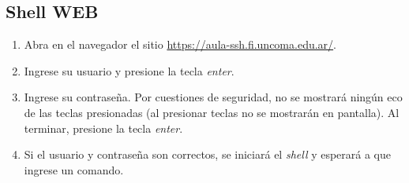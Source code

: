 \documentclass[12pt]{article}
\begin{document}
\subsection{Shell WEB}

\begin{enumerate}
    \item Abra en el navegador el sitio
        \url{https://aula-ssh.fi.uncoma.edu.ar/}.

    \item Ingrese su usuario y presione la tecla \emph{enter}.

    \item Ingrese su contraseña. Por cuestiones de seguridad, no se mostrará
        ningún eco de las teclas presionadas (al presionar teclas no se
        mostrarán en pantalla). Al terminar, presione la tecla 
        \emph{enter}.

    \item Si el usuario y contraseña son correctos, se iniciará el
        \emph{shell} y esperará a que ingrese un comando.

\end{enumerate}
\end{document}
